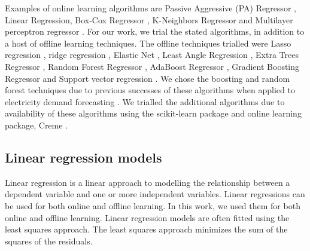 


Examples of online learning algorithms are Passive Aggressive (PA) Regressor \cite{Gzik2014}, Linear Regression, Box-Cox Regressor \cite{Box1964}, K-Neighbors Regressor \cite{forgy65} and Multilayer perceptron regressor \cite{Hinton1989}. For our work, we trial the stated algorithms, in addition to a host of offline learning techniques. The offline techniques trialled were Lasso regression \cite{Tibshirani1996a}, ridge regression \cite{GeladiPaul1994Mrac},  Elastic Net \cite{Geostatistics2010}, Least Angle Regression \cite{Fike1988}, Extra Trees Regressor \cite{Fike1988}, Random Forest Regressor \cite{Breiman2001}, AdaBoost Regressor \cite{Freund1997}, Gradient Boosting Regressor \cite{316} and Support vector regression \cite{Cortes1995}. We chose the boosting and random forest techniques due to previous successes of these algorithms when applied to electricity demand forecasting \cite{Kell2018}. We trialled the additional algorithms due to availability of these algorithms using the scikit-learn package and online learning package, Creme \cite{scikit-learn,creme}. %


\subsection{Linear regression models}


Linear regression is a linear approach to modelling the relationship between a dependent variable and one or more independent variables. Linear regressions can be used for both online and offline learning. In this work, we used them for both online and offline learning. Linear regression models are often fitted using the least squares approach. The least squares approach minimizes the sum of the squares of the residuals. 

